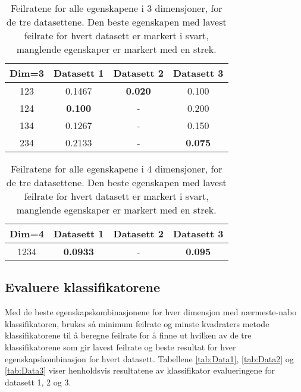 \documentclass[twocolumn,norwegian]{article}
\begin{document}
\begin{table}[h!]
	\centering
	\begin{tabular}{| c | c  c  c |}
		\hline
		\rule{0pt}{10pt}Dim=3 & Datasett 1 & Datasett 2 & Datasett 3 \\
		\hline
		\rule{0pt}{10pt}123 & 0.1467 & \textbf{0.020} & 0.100 \\
		124 & \textbf{0.100} & - & 0.200 \\
		134 & 0.1267 & - & 0.150 \\
		234 & 0.2133 & - & \textbf{0.075} \\
		\hline
	\end{tabular}
	\caption{Feilratene for alle egenskapene i 3 dimensjoner, for de tre datasettene. Den beste egenskapen med lavest feilrate for hvert datasett er markert i svart, manglende egenskaper er markert med en strek.}
	\label{tab:Dim3}
\end{table}
\begin{table}[h!]
	\centering
	\begin{tabular}{| c | c  c  c |}
		\hline
		\rule{0pt}{10pt}Dim=4 & Datasett 1 & Datasett 2 & Datasett 3 \\
		\hline
		\rule{0pt}{10pt}1234 & \textbf{0.0933} & - & \textbf{0.095} \\
		\hline
	\end{tabular}
	\caption{Feilratene for alle egenskapene i 4 dimensjoner, for de tre datasettene. Den beste egenskapen med lavest feilrate for hvert datasett er markert i svart, manglende egenskaper er markert med en strek.}
	\label{tab:Dim4}
\end{table}

\subsection{Evaluere klassifikatorene}
Med de beste egenskapskombinasjonene for hver dimensjon med nærmeste-nabo klassifikatoren, brukes så minimum feilrate og minste kvadraters metode klassifikatorene til å beregne feilrate for å finne ut hvilken av de tre klassifikatorene som gir lavest feilrate og beste resultat for hver egenskapskombinasjon for hvert datasett. Tabellene \ref{tab:Data1}, \ref{tab:Data2} og \ref{tab:Data3} viser henholdsvis resultatene av klassifikator evalueringene for datasett 1, 2 og 3. 
\end{document}
